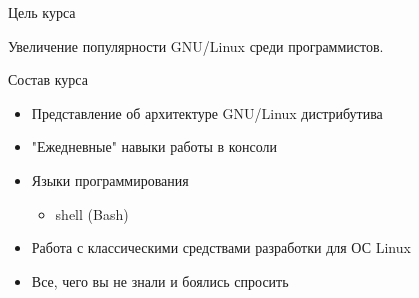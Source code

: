 \begin{frame}{Цель курса}
	\begin{center}
		\Huge
		Увеличение популярности GNU/Linux среди программистов.
	\end{center}
\end{frame}


\begin{frame}{Состав курса}
	\begin{itemize}
		\item Представление об архитектуре GNU/Linux дистрибутива
			\pause
		\item "Ежедневные" навыки работы в консоли
			\pause
		\item Языки программирования
			\begin{itemize}
					\item shell (Bash)
			\end{itemize}
			\pause
		\item Работа с классическими средствами разработки для ОС Linux
			\pause
		\item Все, чего вы не знали и боялись спросить
	\end{itemize}
\end{frame}
